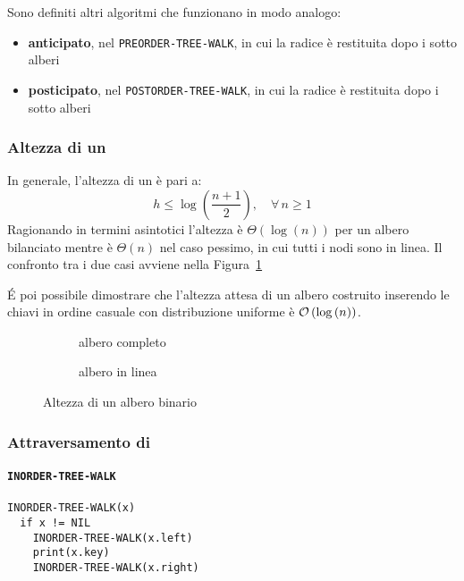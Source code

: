 \documentclass[italian, 10pt]{article}
\begin{document}
Sono definiti altri algoritmi che funzionano in modo analogo:

\begin{itemize}
  \item \textbf{anticipato}, nel \texttt{PREORDER-TREE-WALK}, in cui la radice è restituita dopo i sotto alberi
  \item \textbf{posticipato}, nel \texttt{POSTORDER-TREE-WALK}, in cui la radice è restituita dopo i sotto alberi
\end{itemize}

\subsubsection{Altezza di un \BST}

In generale, l'altezza di un \BST è pari a:
\[ h \leq \log{\left(\dfrac{n+1}{2}\right)}, \quad \forall \, n \geq 1\]
Ragionando in termini asintotici l'altezza è \(\Theta(\log{(n)})\) per un albero bilanciato mentre è \(\Theta(n)\) nel caso pessimo, in cui tutti i nodi sono in linea.
Il confronto tra i due casi avviene nella Figura~\ref{fig:altezza-albero-binario}

\bigskip
É poi possibile dimostrare che l'altezza attesa di un albero costruito inserendo le chiavi in ordine casuale con distribuzione uniforme è \(\mathcal{O}\left(\log{(n)}\right)\).

\begin{figure}[htbp]
  \bigskip
  \centering
  \begin{subfigure}[b]{0.495\textwidth}
    \centering
    \caption{albero completo}
  \end{subfigure}
  \begin{subfigure}[b]{0.495\textwidth}
    \centering
    \caption{albero in linea}
  \end{subfigure}
  \caption{Altezza di un albero binario}
  \label{fig:altezza-albero-binario}
  \bigskip
\end{figure}

\subsubsection{Attraversamento di \BST}

\paragraph{\texttt{INORDER-TREE-WALK} }

\begin{lstlisting}[style=pseudocode, caption={Attraversamento simmetrico di \BST}, label={lst:attraversamento-bst-inorder}]
INORDER-TREE-WALK(x)
  if x != NIL
    INORDER-TREE-WALK(x.left)
    print(x.key)
    INORDER-TREE-WALK(x.right)
\end{lstlisting}
\end{document}
